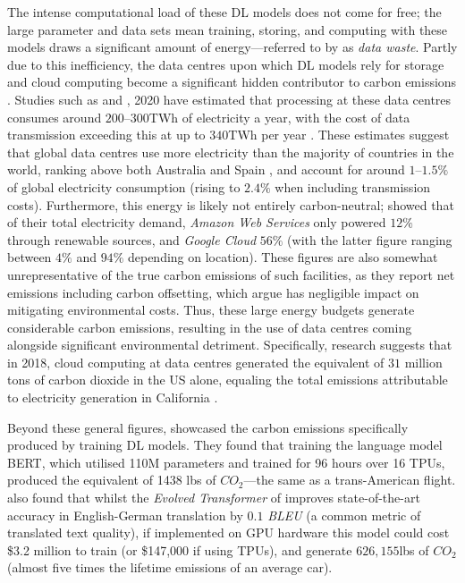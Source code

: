 \documentclass[a4paper, 11pt]{report}
\begin{document}
    The intense computational load of these DL models does not come for free; the large parameter and data sets mean training, storing, and computing with these models draws a significant amount of energy---referred to by \citet{bietti-2019} as \emph{data waste}. Partly due to this inefficiency, the data centres upon which DL models rely for storage and cloud computing become a significant hidden contributor to carbon emissions \citep{aljarrah-2015}. Studies such as \citet{masanet-2020} and \citet{malmodin-2018}, 2020 have estimated that processing at these data centres consumes around $200\text{--}300$TWh of electricity a year, with the cost of data transmission exceeding this at up to $340$TWh per year \citep{iea-2022}. These estimates suggest that global data centres use more electricity than the majority of countries in the world, ranking above both Australia and Spain \citep{eia-2019}, and account for around $1\text{--}1.5\%$ of global electricity consumption (rising to $2.4\%$ when including transmission costs). Furthermore, this energy is likely not entirely carbon-neutral; \citet{cook-2017} showed that of their total electricity demand, \emph{Amazon Web Services} only powered $12\%$ through renewable sources, and \emph{Google Cloud} $56\%$ (with the latter figure ranging between $4\%$ and $94\%$ depending on location). These figures are also somewhat unrepresentative of the true carbon emissions of such facilities, as they report net emissions including carbon offsetting, which \citet{schwartz-2019} argue has negligible impact on mitigating environmental costs. Thus, these large energy budgets generate considerable carbon emissions, resulting in the use of data centres coming alongside significant environmental detriment. Specifically, research suggests that in 2018, cloud computing at data centres generated the equivalent of $31$ million tons of carbon dioxide \citep{hockstad-2018} in the US alone, equaling the total emissions  attributable to electricity generation in California \citep{iea-2022}.

    Beyond these general figures, \citet{strubell-2019} showcased the carbon emissions specifically produced by training DL models. They found that training the language model BERT, which utilised 110M parameters and trained for 96 hours over 16 TPUs, produced the equivalent of 1438 lbs of $CO_2$---the same as a trans-American flight. \citeauthor{strubell-2019} also found that whilst the \emph{Evolved Transformer} of \citet{so-2019} improves state-of-the-art accuracy in English-German translation by $0.1$ \emph{BLEU} (a common metric of translated text quality), if implemented on GPU hardware this model could cost \$3.2 million to train (or \$147,000 if using TPUs), and generate $626,155$lbs of $CO_2$ (almost five times the lifetime emissions of an average car).
\end{document}
